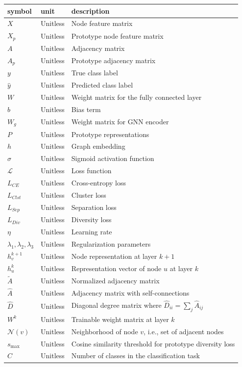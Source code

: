 \documentclass[12pt]{article}
\begin{document}
\renewcommand{\arraystretch}{1.2}
\noindent \begin{longtable*}{l l p{12cm}} \toprule
\textbf{symbol} & \textbf{unit} & \textbf{description} \\
\midrule 
$X$ & Unitless & Node feature matrix \\
$X_p$ & Unitless & Prototype node feature matrix \\
$A$ & Unitless & Adjacency matrix \\
$A_p$ & Unitless & Prototype adjacency matrix \\
$y$ & Unitless & True class label \\
$\hat{y}$ & Unitless & Predicted class label \\
$W$ & Unitless & Weight matrix for the fully connected layer \\
$b$ & Unitless & Bias term \\
$W_g$ & Unitless & Weight matrix for GNN encoder \\
$P$ & Unitless & Prototype representations \\
$h$ & Unitless & Graph embedding \\
$\sigma$ & Unitless & Sigmoid activation function \\
$\mathcal{L}$ & Unitless & Loss function \\
$L_{CE}$ & Unitless & Cross-entropy loss \\
$L_{Clst}$ & Unitless & Cluster loss \\
$L_{Sep}$ & Unitless & Separation loss \\
$L_{Div}$ & Unitless & Diversity loss \\
$\eta$ & Unitless & Learning rate \\
$\lambda_1, \lambda_2, \lambda_3$ & Unitless & Regularization parameters \\
$h_v^{k+1}$ & Unitless & Node representation at layer $k+1$ \\
$h_u^k$ & Unitless & Representation vector of node $u$ at layer $k$ \\
$\tilde{A}$ & Unitless & Normalized adjacency matrix \\
$\hat{A}$ & Unitless & Adjacency matrix with self-connections \\
$\hat{D}$ & Unitless & Diagonal degree matrix where $\hat{D}_{ii} = \sum_j \hat{A}_{ij}$ \\
$W^k$ & Unitless & Trainable weight matrix at layer $k$ \\
$\mathcal{N}(v)$ & Unitless & Neighborhood of node $v$, i.e., set of adjacent nodes \\
$s_{\max}$ & Unitless & Cosine similarity threshold for prototype diversity loss \\
$C$ & Unitless & Number of classes in the classification task \\
\bottomrule
\end{longtable*}
\end{document}

